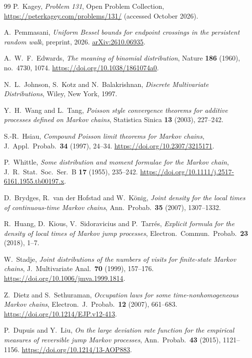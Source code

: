 \documentclass[11pt]{article}
\theoremstyle{definition}
\theoremstyle{remark}
\begin{document}
{\small
\begin{thebibliography}{99}
P.~Kagey, \emph{Problem 131}, Open Problem Collection,
\url{https://peterkagey.com/problems/131/} (accessed October 2026).

A.~Pemmasani, \emph{Uniform Bessel bounds for endpoint crossings in the
persistent random walk}, preprint, 2026.
\href{https://arxiv.org/abs/2610.06935}{arXiv:2610.06935}.


A.~W.~F.~Edwards, \emph{The meaning of binomial distribution}, Nature
\textbf{186} (1960), no.~4730, 1074. \url{https://doi.org/10.1038/1861074a0}.

N.~L.~Johnson, S.~Kotz and N.~Balakrishnan, \emph{Discrete Multivariate
Distributions}, Wiley, New York, 1997.

Y.~H.~Wang and L.~Tang, \emph{Poisson style convergence theorems for
additive processes defined on Markov chains},
Statistica Sinica \textbf{13} (2003), 227--242.

S.-R.~Hsiau, \emph{Compound Poisson limit theorems for Markov chains},
J.~Appl.~Probab.~\textbf{34} (1997), 24--34.
\url{https://doi.org/10.2307/3215171}.

P.~Whittle, \emph{Some distribution and moment formulae for the Markov
chain}, J.\ R.\ Stat.\ Soc.\ Ser.~B \textbf{17} (1955), 235--242.
\url{https://doi.org/10.1111/j.2517-6161.1955.tb00197.x}.

D.~Brydges, R.~van der Hofstad and W.~K\"onig,
\emph{Joint density for the local times of continuous-time Markov chains},
Ann.~Probab.~\textbf{35} (2007), 1307--1332.

R.~Huang, D.~Kious, V.~Sidoravicius and P.~Tarr\'es, \emph{Explicit formula for
the density of local times of Markov jump processes},
Electron.~Commun.~Probab.~\textbf{23} (2018), 1--7.

W.~Stadje, \emph{Joint distributions of the numbers of visits for finite-state
Markov chains}, J.~Multivariate Anal.~\textbf{70} (1999), 157--176.
\url{https://doi.org/10.1006/jmva.1999.1814}.

Z.~Dietz and S.~Sethuraman, \emph{Occupation laws for some
time-nonhomogeneous Markov chains}, Electron.~J.~Probab.~\textbf{12}
(2007), 661--683. \url{https://doi.org/10.1214/EJP.v12-413}.

P.~Dupuis and Y.~Liu, \emph{On the large deviation rate function for the
empirical measures of reversible jump Markov processes},
Ann.~Probab.~\textbf{43} (2015), 1121--1156.
\url{https://doi.org/10.1214/13-AOP883}.


\end{thebibliography}}
\end{document}
